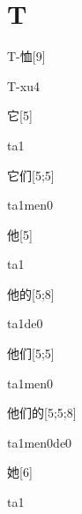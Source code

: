 ﻿%
\section*{T}

\begin{verbete}[T-xu4]{T-恤}[9]
\begin{pronuncia}{T-xu4}
\end{pronuncia}
\end{verbete}

\begin{verbete}[ta1]{它}[5]
\begin{pronuncia}{ta1}
\end{pronuncia}
\end{verbete}

\begin{verbete}[ta1men0]{它们}[5;5]
\begin{pronuncia}{ta1men0}
\end{pronuncia}
\end{verbete}

\begin{verbete}[ta1]{他}[5]
\begin{pronuncia}{ta1}
\end{pronuncia}
\end{verbete}

\begin{verbete}[ta1de0]{他的}[5;8]
\begin{pronuncia}{ta1de0}
\end{pronuncia}
\end{verbete}

\begin{verbete}[ta1men0]{他们}[5;5]
\begin{pronuncia}{ta1men0}
\end{pronuncia}
\end{verbete}

\begin{verbete}[ta1men0de0]{他们的}[5;5;8]
\begin{pronuncia}{ta1men0de0}
\end{pronuncia}
\end{verbete}

\begin{verbete}[ta1]{她}[6]
\begin{pronuncia}{ta1}
\end{pronuncia}
\end{verbete}

